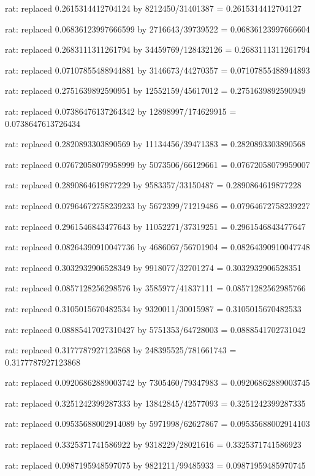 \documentclass[a4paper,10pt]{article}
\begin{document}
\begin{eulernotebook}
\begin{eulercomment}
\begin{eulercomment}
\begin{eulercomment}
\begin{eulercomment}
\begin{eulercomment}
\begin{eulercomment}
\begin{eulercomment}
\begin{eulercomment}
\begin{eulercomment}
\begin{eulercomment}
\begin{eulercomment}
\begin{eulercomment}
\begin{eulercomment}
\begin{eulercomment}
\begin{eulercomment}
\begin{eulercomment}
\begin{euleroutput}
  rat: replaced 0.2615314412704124 by 8212450/31401387 = 0.2615314412704127
  
  rat: replaced 0.06836123997666599 by 2716643/39739522 = 0.06836123997666604
  
  rat: replaced 0.2683111311261794 by 34459769/128432126 = 0.2683111311261794
  
  rat: replaced 0.07107855488944881 by 3146673/44270357 = 0.07107855488944893
  
  rat: replaced 0.2751639892590951 by 12552159/45617012 = 0.2751639892590949
  
  rat: replaced 0.07386476137264342 by 12898997/174629915 = 0.0738647613726434
  
  rat: replaced 0.2820893303890569 by 11134456/39471383 = 0.2820893303890568
  
  rat: replaced 0.07672058079958999 by 5073506/66129661 = 0.07672058079959007
  
  rat: replaced 0.2890864619877229 by 9583357/33150487 = 0.2890864619877228
  
  rat: replaced 0.07964672758239233 by 5672399/71219486 = 0.07964672758239227
  
  rat: replaced 0.2961546843477643 by 11052271/37319251 = 0.2961546843477647
  
  rat: replaced 0.08264390910047736 by 4686067/56701904 = 0.08264390910047748
  
  rat: replaced 0.3032932906528349 by 9918077/32701274 = 0.3032932906528351
  
  rat: replaced 0.0857128256298576 by 3585977/41837111 = 0.08571282562985766
  
  rat: replaced 0.3105015670482534 by 9320011/30015987 = 0.3105015670482533
  
  rat: replaced 0.08885417027310427 by 5751353/64728003 = 0.0888541702731042
  
  rat: replaced 0.3177787927123868 by 248395525/781661743 = 0.3177787927123868
  
  rat: replaced 0.09206862889003742 by 7305460/79347983 = 0.09206862889003745
  
  rat: replaced 0.3251242399287333 by 13842845/42577093 = 0.3251242399287335
  
  rat: replaced 0.09535688002914089 by 5971998/62627867 = 0.09535688002914103
  
  rat: replaced 0.3325371741586922 by 9318229/28021616 = 0.3325371741586923
  
  rat: replaced 0.0987195948597075 by 9821211/99485933 = 0.09871959485970745
  

\end{euleroutput}
\end{eulercomment}
\end{eulercomment}
\end{eulercomment}
\end{eulercomment}
\end{eulercomment}
\end{eulercomment}
\end{eulercomment}
\end{eulercomment}
\end{eulercomment}
\end{eulercomment}
\end{eulercomment}
\end{eulercomment}
\end{eulercomment}
\end{eulercomment}
\end{eulercomment}
\end{eulercomment}
\end{eulernotebook}
\end{document}
